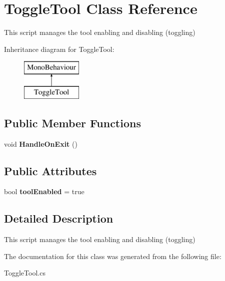 \hypertarget{class_toggle_tool}{}\section{Toggle\+Tool Class Reference}
\label{class_toggle_tool}


This script manages the tool enabling and disabling (toggling)  


Inheritance diagram for Toggle\+Tool\+:\begin{figure}[H]
\begin{center}
\leavevmode
\includegraphics[height=2.000000cm]{class_toggle_tool}
\end{center}
\end{figure}
\subsection*{Public Member Functions}
\begin{DoxyCompactItemize}
\item 
\mbox{\label{class_toggle_tool_ac762d14aa1b31efbf98c87b1dd01e7f7}} 
void {\bfseries Handle\+On\+Exit} ()
\end{DoxyCompactItemize}
\subsection*{Public Attributes}
\begin{DoxyCompactItemize}
\item 
\mbox{\label{class_toggle_tool_a7a098df27a26933369a7689fddc76d29}} 
bool {\bfseries tool\+Enabled} = true
\end{DoxyCompactItemize}


\subsection{Detailed Description}
This script manages the tool enabling and disabling (toggling) 



The documentation for this class was generated from the following file\+:\begin{DoxyCompactItemize}
\item 
Toggle\+Tool.\+cs\end{DoxyCompactItemize}
